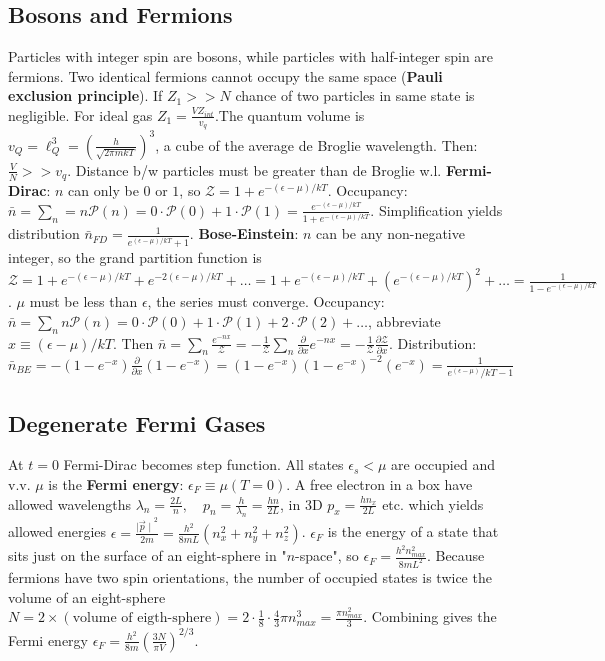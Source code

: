 \documentclass[11pt,twocolumn]{amsart}
\begin{document}
\subsection{Bosons and Fermions}
Particles with integer spin are bosons, while particles with half-integer spin are fermions. Two identical fermions cannot occupy the same space (\textbf{Pauli exclusion principle}). If $Z_1 >> N$ chance of two particles in same state is negligible. For ideal gas $Z_1 = \frac{V Z_{int}}{v_q} $.The quantum volume is $ v_Q = \ell_Q^3 = \left( \frac{h}{\sqrt{2\pi mkT}} \right)^3 $, a cube of the average de Broglie wavelength. Then: $ \frac{V}{N} >>v_q$. Distance b/w particles must be greater than de Broglie w.l.
\textbf{Fermi-Dirac}: $n$ can only be $0$ or $1$, so $\mathcal{Z} = 1 + e^{-(\epsilon-\mu)/kT}$. Occupancy: $ \bar{n} = \sum_n = n\mathcal{P}(n) = 0 \cdot \mathcal{P}(0) + 1 \cdot \mathcal{P}(1) = \frac{e^{-(\epsilon - \mu)/kT}}{1 + e^{-(\epsilon - \mu)/kT}} $. Simplification yields distribution $\bar{n}_{FD} = \frac{1}{e^{(\epsilon-\mu)/kT} + 1} $.
\textbf{Bose-Einstein}: $n$ can be any non-negative integer, so the grand partition function is $ \mathcal{Z} = 1 + e^{-(\epsilon-\mu)/kT} + e^{-2(\epsilon-\mu)/kT} + \dots = 1 + e^{-(\epsilon-\mu)/kT} + (e^{-(\epsilon-\mu)/kT})^2 + \dots = \frac{1}{1-e^{-(\epsilon-\mu)/kT}}$. $\mu$ must be less than $\epsilon$, the series must converge. Occupancy: $ \bar{n} = \sum_n n \mathcal{P}(n) = 0 \cdot \mathcal{P}(0) + 1 \cdot \mathcal{P}(1) + 2 \cdot \mathcal{P}(2) + \dots $, abbreviate $x \equiv (\epsilon-\mu)/kT$. Then $\bar{n} = \sum_n \frac{e^{-nx}}{\mathcal{Z}} = -\frac{1}{\mathcal{Z}} \sum_n \frac{\partial}{\partial x} e^{-nx} = -\frac{1}{\mathcal{Z}}\frac{\partial\mathcal{Z}}{\partial x}$. Distribution: $ \bar{n}_{BE} = -(1-e^{-x})\frac{\partial}{\partial x}(1-e^{-x}) = (1-e^{-x})(1-e^{-x})^{-2}(e^{-x}) = \frac{1}{e^(\epsilon-\mu)/kT-1} $

\subsection{Degenerate Fermi Gases}
At $t=0$ Fermi-Dirac becomes step function. All states $\epsilon_s < \mu$ are occupied and v.v. $\mu$ is the \textbf{Fermi energy}: $ \epsilon_{F} \equiv \mu(T=0)$. A free electron in a box have allowed wavelengths $ \lambda_n = \frac{2L}{n}, \quad p_n = \frac{h}{\lambda_n} = \frac{hn}{2L} $, in 3D $ p_x = \frac{hn_x}{2L}$ etc. which yields allowed energies $ \epsilon = \frac{\mid {\vec{p} \mid }^2}{2m} = \frac{h^2}{8mL}(n_x^2 + n_y^2 + n_z^2) $. $\epsilon_F$ is the energy of a state that sits just on the surface of an eight-sphere in "$n$-space", so $ \epsilon_F = \frac{h^2n^2_{max}}{8mL^2} $. Because fermions have two spin orientations, the number of occupied states is twice the volume of an eight-sphere $ N = 2 \times (\text{volume of eigth-sphere}) = 2 \cdot \frac{1}{8} \cdot \frac{4}{3} \pi n^3_{max} = \frac{\pi n^2_{max}}{3} $. Combining gives the Fermi energy $ \epsilon_F = \frac{h^2}{8m} \left( \frac{3N}{\pi V} \right)^{2/3} $.
\end{document}
